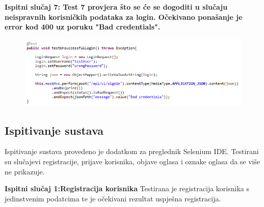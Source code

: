 			\textbf{Ispitni slučaj 7: Test 7 provjera što se će se dogoditi u slučaju neispravnih korisničkih podataka za login. 
Očekivano ponašanje je error kod 400 uz poruku "Bad credentials".
}	
			
			\begin{figure}[H]
				\includegraphics[scale=0.9]{slike/test7.PNG} %
				\centering
				\label{fig:test7}
			\end{figure}
			
			
			
			\subsection{Ispitivanje sustava}
			
			 Ispitivanje sustava provedeno je dodatkom za preglednik Selenium IDE. Testirani su slučajevi registracije, prijave korisnika, objave oglasa i oznake oglasa da se više ne prikazuje.
			 
			 \textbf{Ispitni slučaj 1:Registracija korisnika
}	
Testirana je registracija korisnika s jedinstvenim podatcima te je očekivani rezultat uspješna registracija.
			
